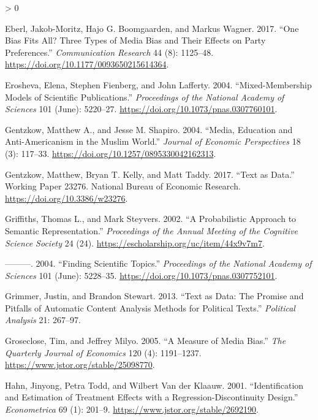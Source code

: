 \documentclass[
  12pt,
]{article}
\newlength{\cslhangindent}
\newenvironment{CSLReferences}[2] %
 {%
  \setlength{\parindent}{0pt}
  \ifodd #1 \everypar{\setlength{\hangindent}{\cslhangindent}}\ignorespaces\fi
  \ifnum #2 > 0
  \setlength{\parskip}{#2\baselineskip}
  \fi
 }%
 {}
\begin{document}
\begin{CSLReferences}{1}{0}
\leavevmode\hypertarget{ref-eberl_one_2017}{}%
Eberl, Jakob-Moritz, Hajo G. Boomgaarden, and Markus Wagner. 2017.
{``One Bias Fits All? Three Types of Media Bias and Their Effects on
Party Preferences.''} \emph{Communication Research} 44 (8): 1125--48.
\url{https://doi.org/10.1177/0093650215614364}.

\leavevmode\hypertarget{ref-erosheva_mixed-membership_2004}{}%
Erosheva, Elena, Stephen Fienberg, and John Lafferty. 2004.
{``Mixed-Membership Models of Scientific Publications.''}
\emph{Proceedings of the National Academy of Sciences} 101 (June):
5220--27. \url{https://doi.org/10.1073/pnas.0307760101}.

\leavevmode\hypertarget{ref-gentzkow_media_2004}{}%
Gentzkow, Matthew A., and Jesse M. Shapiro. 2004. {``Media, Education
and Anti-Americanism in the Muslim World.''} \emph{Journal of Economic
Perspectives} 18 (3): 117--33.
\url{https://doi.org/10.1257/0895330042162313}.

\leavevmode\hypertarget{ref-gentzkow_text_2017}{}%
Gentzkow, Matthew, Bryan T. Kelly, and Matt Taddy. 2017. {``Text as
Data.''} Working Paper 23276. National Bureau of Economic Research.
\url{https://doi.org/10.3386/w23276}.

\leavevmode\hypertarget{ref-griffiths_probabilistic_2002}{}%
Griffiths, Thomas L., and Mark Steyvers. 2002. {``A Probabilistic
Approach to Semantic Representation.''} \emph{Proceedings of the Annual
Meeting of the Cognitive Science Society} 24 (24).
\url{https://escholarship.org/uc/item/44x9v7m7}.

\leavevmode\hypertarget{ref-griffiths_finding_2004}{}%
---------. 2004. {``Finding Scientific Topics.''} \emph{Proceedings of
the National Academy of Sciences} 101 (June): 5228--35.
\url{https://doi.org/10.1073/pnas.0307752101}.

\leavevmode\hypertarget{ref-grimmer_text_2013}{}%
Grimmer, Justin, and Brandon Stewart. 2013. {``Text as Data: The Promise
and Pitfalls of Automatic Content Analysis Methods for Political
Texts.''} \emph{Political Analysis} 21: 267--97.

\leavevmode\hypertarget{ref-groseclose_measure_2005}{}%
Groseclose, Tim, and Jeffrey Milyo. 2005. {``A Measure of Media Bias.''}
\emph{The Quarterly Journal of Economics} 120 (4): 1191--1237.
\url{https://www.jstor.org/stable/25098770}.

\leavevmode\hypertarget{ref-hahn_identification_2001}{}%
Hahn, Jinyong, Petra Todd, and Wilbert Van der Klaauw. 2001.
{``Identification and Estimation of Treatment Effects with a
Regression-Discontinuity Design.''} \emph{Econometrica} 69 (1): 201--9.
\url{https://www.jstor.org/stable/2692190}.


\end{CSLReferences}
\end{document}
